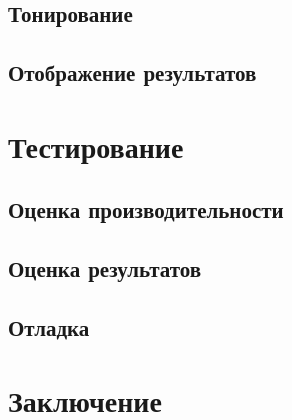\documentclass[12pt]{article}
\begin{document}
\subsection{Тонирование}
\subsection{Отображение результатов}
\newpage\section{Тестирование}
\subsection{Оценка производительности}
\subsection{Оценка результатов}
\subsection{Отладка}
\newpage\section*{Заключение}
\end{document}

